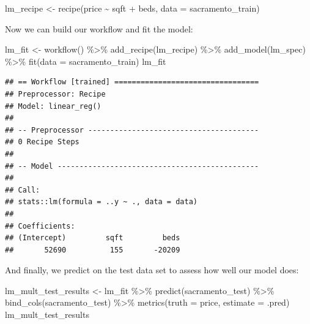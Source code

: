 \documentclass[
]{krantz}
\makeatletter
\newenvironment{Shaded}{\begin{snugshade}}{\end{snugshade}}
\newcommand{\AttributeTok}[1]{\textcolor[rgb]{0.61,0.61,0.61}{#1}}
\newcommand{\FunctionTok}[1]{\textcolor[rgb]{0,0,0}{#1}}
\newcommand{\NormalTok}[1]{#1}
\newcommand{\OtherTok}[1]{\textcolor[rgb]{0.37,0.37,0.37}{#1}}
\newcommand{\SpecialCharTok}[1]{\textcolor[rgb]{0,0,0}{#1}}
\newenvironment{kframe}{%
\medskip{}
\setlength{\fboxsep}{.8em}
 \def\at@end@of@kframe{}%
 \ifinner\ifhmode%
  \def\at@end@of@kframe{\end{minipage}}%
  \begin{minipage}{\columnwidth}%
 \fi\fi%
 \def\FrameCommand##1{\hskip\@totalleftmargin \hskip-\fboxsep
 \colorbox{shadecolor}{##1}\hskip-\fboxsep
     \hskip-\linewidth \hskip-\@totalleftmargin \hskip\columnwidth}%
 \MakeFramed {\advance\hsize-\width
   \@totalleftmargin\z@ \linewidth\hsize
   \@setminipage}}%
 {\par\unskip\endMakeFramed%
 \at@end@of@kframe}
\renewenvironment{Shaded}{\begin{kframe}}{\end{kframe}}
\makeatother
\begin{document}
\begin{Shaded}
\begin{Highlighting}[]
\NormalTok{lm\_recipe }\OtherTok{\textless{}{-}} \FunctionTok{recipe}\NormalTok{(price }\SpecialCharTok{\textasciitilde{}}\NormalTok{ sqft }\SpecialCharTok{+}\NormalTok{ beds, }\AttributeTok{data =}\NormalTok{ sacramento\_train)}
\end{Highlighting}
\end{Shaded}

Now we can build our workflow and fit the model:

\begin{Shaded}
\begin{Highlighting}[]
\NormalTok{lm\_fit }\OtherTok{\textless{}{-}} \FunctionTok{workflow}\NormalTok{() }\SpecialCharTok{\%\textgreater{}\%}
  \FunctionTok{add\_recipe}\NormalTok{(lm\_recipe) }\SpecialCharTok{\%\textgreater{}\%}
  \FunctionTok{add\_model}\NormalTok{(lm\_spec) }\SpecialCharTok{\%\textgreater{}\%}
  \FunctionTok{fit}\NormalTok{(}\AttributeTok{data =}\NormalTok{ sacramento\_train)}
\NormalTok{lm\_fit}
\end{Highlighting}
\end{Shaded}

\begin{verbatim}
## == Workflow [trained] =================================
## Preprocessor: Recipe
## Model: linear_reg()
## 
## -- Preprocessor ---------------------------------------
## 0 Recipe Steps
## 
## -- Model ----------------------------------------------
## 
## Call:
## stats::lm(formula = ..y ~ ., data = data)
## 
## Coefficients:
## (Intercept)         sqft         beds  
##       52690          155       -20209
\end{verbatim}

And finally, we predict on the test data set to assess how well our model does:

\begin{Shaded}
\begin{Highlighting}[]
\NormalTok{lm\_mult\_test\_results }\OtherTok{\textless{}{-}}\NormalTok{ lm\_fit }\SpecialCharTok{\%\textgreater{}\%}
  \FunctionTok{predict}\NormalTok{(sacramento\_test) }\SpecialCharTok{\%\textgreater{}\%}
  \FunctionTok{bind\_cols}\NormalTok{(sacramento\_test) }\SpecialCharTok{\%\textgreater{}\%}
  \FunctionTok{metrics}\NormalTok{(}\AttributeTok{truth =}\NormalTok{ price, }\AttributeTok{estimate =}\NormalTok{ .pred)}
\NormalTok{lm\_mult\_test\_results}
\end{Highlighting}
\end{Shaded}
\end{document}
